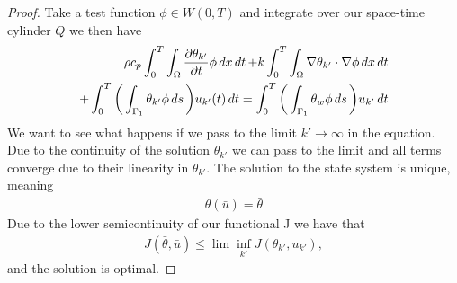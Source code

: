 \begin{proof}
Take a test function $\phi \in W(0,T)$ and integrate over our space-time cylinder $Q$ we then have 
\begin{align*}
    \rho c_p \int_0^T\int_{\Omega}\frac{\partial \theta_{k'}}{\partial t}\phi \mathop{dx}\mathop{dt} + k \int_0^T \int_{\Omega}\nabla \theta_{k'} \cdot \nabla \phi \mathop{dx}\mathop{dt} \\ + \int_0^T \bigg (\int_{\Gamma_1}\theta_{k'}\phi \mathop{ds} \bigg )u_{k'}(t) \mathop{dt} =
    \int_0^T \bigg (\int_{\Gamma_1}\theta_w\phi \mathop{ds} \bigg ) u_{k'} \mathop{dt} 
\end{align*}
We want to see what happens if we pass to the limit $k' \rightarrow \infty$ in the equation. Due to the continuity of the solution $\theta_{k'}$ we can pass to the limit and all terms converge due to their linearity in $\theta_{k'}$. The solution to the state system is unique, meaning
\begin{align*}
    \theta(\bar{u}) = \bar{\theta} 
\end{align*}
Due to the lower semicontinuity of our functional J we have that 
\begin{align*}
    J(\bar{\theta}, \bar{u}) \leq \lim \inf_{k'} J(\theta_{k'}, u_{k'}),
\end{align*}
and the solution is optimal. 
\end{proof}